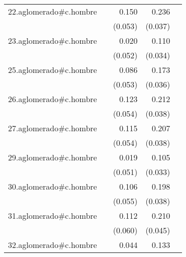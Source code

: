 {\begin{longtable}{l*{4}{D{.}{.}{-1}}}
\addlinespace
22.aglomerado#c.hombre&                     &       0.150\sym{**} &       0.236\sym{***}&                     \\
            &                     &     (0.053)         &     (0.037)         &                     \\
\addlinespace
23.aglomerado#c.hombre&                     &       0.020         &       0.110\sym{**} &                     \\
            &                     &     (0.052)         &     (0.034)         &                     \\
\addlinespace
25.aglomerado#c.hombre&                     &       0.086         &       0.173\sym{***}&                     \\
            &                     &     (0.053)         &     (0.036)         &                     \\
\addlinespace
26.aglomerado#c.hombre&                     &       0.123\sym{*}  &       0.212\sym{***}&                     \\
            &                     &     (0.054)         &     (0.038)         &                     \\
\addlinespace
27.aglomerado#c.hombre&                     &       0.115\sym{*}  &       0.207\sym{***}&                     \\
            &                     &     (0.054)         &     (0.038)         &                     \\
\addlinespace
29.aglomerado#c.hombre&                     &       0.019         &       0.105\sym{**} &                     \\
            &                     &     (0.051)         &     (0.033)         &                     \\
\addlinespace
30.aglomerado#c.hombre&                     &       0.106         &       0.198\sym{***}&                     \\
            &                     &     (0.055)         &     (0.038)         &                     \\
\addlinespace
31.aglomerado#c.hombre&                     &       0.112         &       0.210\sym{***}&                     \\
            &                     &     (0.060)         &     (0.045)         &                     \\
\addlinespace
32.aglomerado#c.hombre&                     &       0.044         &       0.133\sym{***}&                     \\

\end{longtable}}
